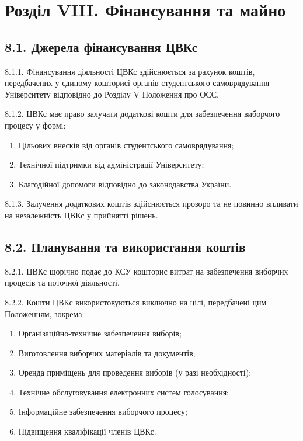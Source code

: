 \section*{Розділ VIII. Фінансування та майно}

\subsection*{8.1. Джерела фінансування ЦВКс}
    8.1.1. Фінансування діяльності ЦВКс здійснюється за рахунок коштів, передбачених у єдиному кошторисі органів студентського самоврядування Університету відповідно до Розділу V Положення про ОСС.

    8.1.2. ЦВКс має право залучати додаткові кошти для забезпечення виборчого процесу у формі:

        \begin{enumerate}[label=\alph*)]
            \item Цільових внесків від органів студентського самоврядування;
            \item Технічної підтримки від адміністрації Університету;
            \item Благодійної допомоги відповідно до законодавства України.
        \end{enumerate}

    8.1.3. Залучення додаткових коштів здійснюється прозоро та не повинно впливати на незалежність ЦВКс у прийнятті рішень.

\subsection*{8.2. Планування та використання коштів}
    8.2.1. ЦВКс щорічно подає до КСУ кошторис витрат на забезпечення виборчих процесів та поточної діяльності.

    8.2.2. Кошти ЦВКс використовуються виключно на цілі, передбачені цим Положенням, зокрема:

        \begin{enumerate}[label=\alph*)]
            \item Організаційно-технічне забезпечення виборів;
            \item Виготовлення виборчих матеріалів та документів;
            \item Оренда приміщень для проведення виборів (у разі необхідності);
            \item Технічне обслуговування електронних систем голосування;
            \item Інформаційне забезпечення виборчого процесу;
            \item Підвищення кваліфікації членів ЦВКс.
        \end{enumerate}

